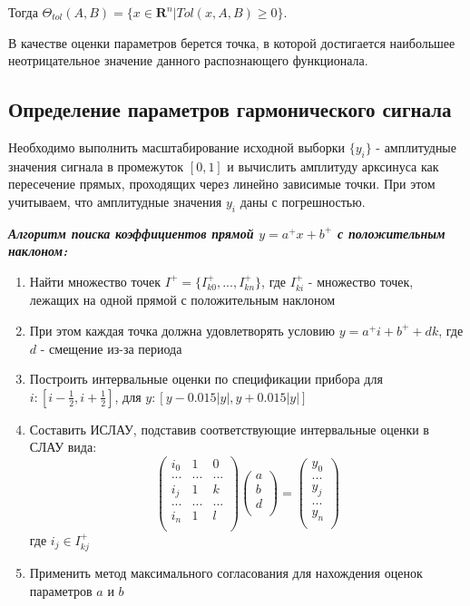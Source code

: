 \documentclass[12pt,a4paper]{article}
\begin{document}
Тогда $\Theta_{tol}(A,B)=\{x\in{\mathbf{R}^n}|Tol(x,A,B)\geq0\}$.

В качестве оценки параметров берется точка, в которой достигается наибольшее неотрицательное значение данного распознающего функционала.

\subsection{Определение параметров гармонического сигнала}
Необходимо выполнить масштабирование исходной выборки $\{y_i\}$ - амплитудные значения сигнала в промежуток $[0,1]$ и вычислить амплитуду арксинуса как пересечение прямых, проходящих через линейно зависимые точки. При этом учитываем, что амплитудные значения $y_i$ даны с погрешностью.

\textbf{\textit{Алгоритм поиска коэффициентов прямой $y=a^+x+b^+$ с положительным наклоном:}}
\begin{enumerate}
    \item Найти множество точек $I^+=\{I^+_{k0},...,I^+_{kn}\}$, где $I^+_{ki}$ - множество точек, лежащих на одной прямой с положительным наклоном
    \item При этом каждая точка должна удовлетворять условию $y=a^+i+b^++dk$, где $d$ - смещение из-за периода
    \item Построить интервальные оценки по спецификации прибора для $i:[i-\frac{1}{2},i+\frac{1}{2}]$, для $y:[y-0.015|y|,y+0.015|y|]$
    \item Составить ИСЛАУ, подставив соответствующие интервальные оценки в СЛАУ вида:
        \begin{equation}
            \begin{pmatrix}
                i_0 & 1 & 0\\
                ... & ... & ...\\
                i_j & 1 & k\\
                ... & ... & ...\\
                i_n & 1 & l\\        
            \end{pmatrix}
            \begin{pmatrix}
                a\\
                b\\
                d\\
            \end{pmatrix}
            =
            \begin{pmatrix}
                y_0\\
                ...\\
                y_j\\
                ...\\
                y_n\\        
            \end{pmatrix}
        \end{equation}
        где $i_j\in{I^+_{kj}}$
    \item Применить метод максимального согласования для нахождения оценок параметров $a$ и $b$
\end{enumerate}
\end{document}
